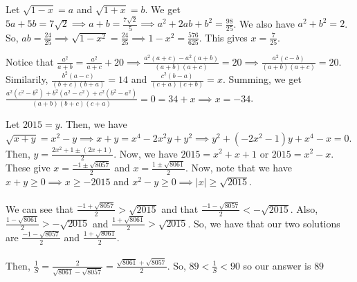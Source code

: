 \documentclass[11pt]{article}
\begin{document}

\begin{sol}
Let $\sqrt{1-x}=a$ and $\sqrt{1+x}=b$. We get $5a+5b=7\sqrt{2}\implies a+b=\frac{7\sqrt{2}}{5}\implies a^2+2ab+b^2 = \frac{98}{25}$. We also have $a^2+b^2=2$. So, $ab=\frac{24}{25}\implies \sqrt{1-x^2}=\frac{24}{25}\implies 1-x^2=\frac{576}{625}$. This gives $x=\boxed{\frac{7}{25}}$.
\end{sol}


\begin{sol}
Notice that $\frac{a^2}{a+b}=\frac{a^2}{a+c}+20\implies \frac{a^2(a+c)-a^2(a+b)}{(a+b)(a+c)}=20\implies \frac{a^2(c-b)}{(a+b)(a+c)}=20$. Similarily, $\frac{b^2(a-c)}{(b+c)(b+a)}=14$ and $\frac{c^2(b-a)}{(c+a)(c+b)}=x$. Summing, we get $\frac{a^{2}(c^2-b^2)+b^{2}(a^2-c^2)+c^2(b^2-a^2)}{(a+b)(b+c)(c+a)}=0=34+x\implies x = \boxed{-34}$.
\end{sol}


\begin{sol}
Let $2015=y$. Then, we have $\sqrt{x+y}=x^2-y\implies x+y=x^4-2x^2y+y^2\implies y^2+(-2x^2-1)y+x^4-x=0$. Then, $y=\frac{2x^2+1 \pm (2x+1)}{2}$. Now, we have $2015=x^2+x+1$ or $2015=x^2-x$. These give $x=\frac{-1 \pm \sqrt{8057}}{2}$ and $x=\frac{1 \pm \sqrt{8061}}{2}$. Now, note that we have $x+y\ge 0 \implies x \ge -2015$ and $x^2-y\ge 0\implies |x|\ge \sqrt{2015}$. \\
\\
We can see that $\frac{-1 + \sqrt{8057}}{2}>\sqrt{2015}$ and that $\frac{-1-\sqrt{8057}}{2} < -\sqrt{2015}$. Also, $\frac{1-\sqrt{8061}}{2} > - \sqrt{2015}$ and $\frac{1+\sqrt{8061}}{2} > \sqrt{2015}$. So, we have that our two solutions are $\frac{-1-\sqrt{8057}}{2}$ and $\frac{1+\sqrt{8061}}{2}$. \\
\\
Then, $\frac{1}{S}=\frac{2}{\sqrt{8061}-\sqrt{8057}}=\frac{\sqrt{8061}+\sqrt{8057}}{2}$. So, $89 < \frac{1}{S} < 90$ so our answer is $\boxed{89}$
\end{sol}
\end{document}
